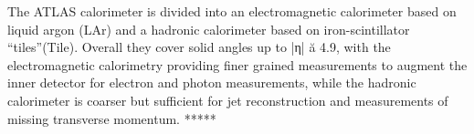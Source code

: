 The ATLAS calorimeter is divided into an electromagnetic calorimeter based on liquid argon (LAr) and a hadronic calorimeter based on iron-scintillator “tiles”(Tile). 
Overall they cover solid angles up to |η| ă 4.9, with the electromagnetic calorimetry providing finer grained measurements to augment the inner detector for electron and photon measurements, while the hadronic calorimeter is coarser but sufficient for jet reconstruction and measurements of missing transverse momentum.
*****


